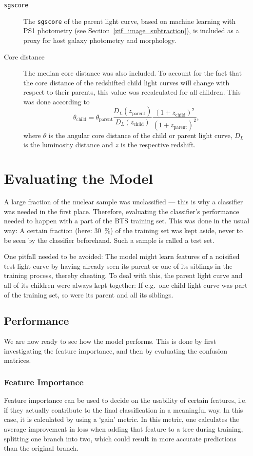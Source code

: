 \begin{description}
  \item[\texttt{sgscore}] The \texttt{sgscore} of the parent light curve, based on machine learning with PS1 photometry (see Section~\ref{ztf_image_subtraction}), is included as a proxy for host galaxy photometry and morphology.
  \item[Core distance] The median core distance was also included. To account for the fact that the core distance of the redshifted child light curves will change with respect to their parents, this value was recalculated for all children. This was done according to
        \begin{equation}
          \theta_\text{child} = \theta_\text{parent} \frac{D_L(z_\text{parent})}{D_L(z_\text{child})} \frac{(1+z_\text{child})^2}{(1+z_\text{parent})^2},
        \end{equation}
        where $\theta$ is the angular core distance of the child or parent light curve, $D_L$ is the luminosity distance and $z$ is the respective redshift.
\end{description}

\section{Evaluating the Model}
A large fraction of the nuclear sample was unclassified --- this is why a classifier was needed in the first place. Therefore, evaluating the classifier's performance needed to happen with a part of the BTS training set. This was done in the usual way: A certain fraction (here: \SI{30}{\percent}) of the training set was kept aside, never to be seen by the classifier beforehand. Such a sample is called a test set.

One pitfall needed to be avoided: The model might learn features of a noisified test light curve by having already seen its parent or one of its siblings in the training process, thereby cheating. To deal with this, the parent light curve and all of its children were always kept together: If e.g.~one child light curve was part of the training set, so were its parent and all its siblings.

\subsection{Performance}
We are now ready to see how the model performs. This is done by first investigating the feature importance, and then by evaluating the confusion matrices.

\subsubsection{Feature Importance}
Feature importance can be used to decide on the usability of certain features, i.e. if they actually contribute to the final classification in a meaningful way. In this case, it is calculated by using a `gain' metric. In this metric, one calculates the average improvement in loss when adding that feature to a tree during training, splitting one branch into two, which could result in more accurate predictions than the original branch.

